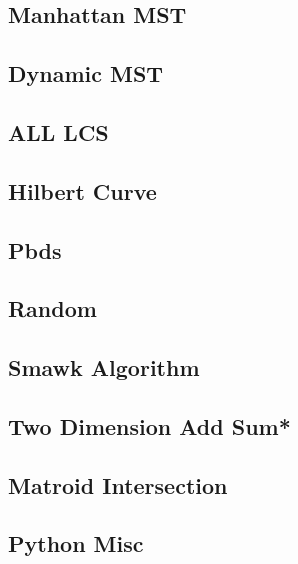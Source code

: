 \subsection{Manhattan MST}

\subsection{Dynamic MST}

\subsection{ALL LCS}

\subsection{Hilbert Curve}

\subsection{Pbds}

\subsection{Random}

\subsection{Smawk Algorithm}

\subsection{Two Dimension Add Sum*}

\subsection{Matroid Intersection}

\subsection{Python Misc}

